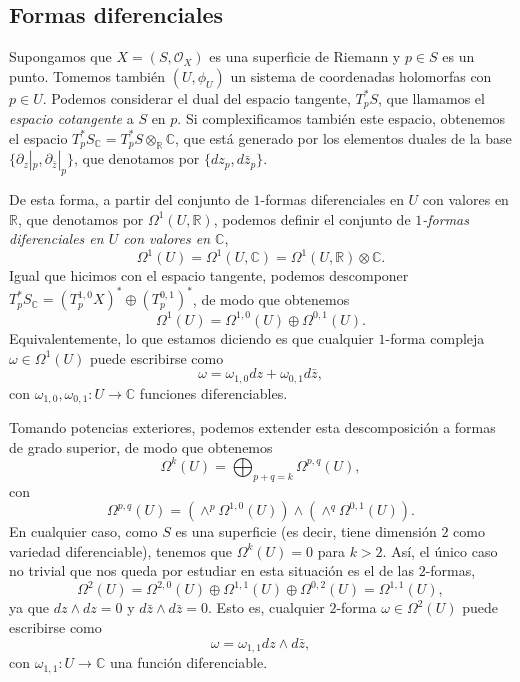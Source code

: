 \documentclass[12pt,a4paper]{article}
\theoremstyle{definition} \newtheorem{defn}[thm]{Definición}
\theoremstyle{definition} \newtheorem{ejemplo}[thm]{Ejemplo}
\theoremstyle{definition} \newtheorem{ejercicio}[thm]{Ejercicio}
\def\CC{\mathbb{C}}
\def\RR{\mathbb{R}}
\def\OO{\mathscr{O}}
\begin{document}
    \subsection{Formas diferenciales}
    Supongamos que $X=(S,\OO_X)$ es una superficie de Riemann y $p\in S$ es un punto. Tomemos también $(U,\phi_U)$ un sistema de coordenadas holomorfas con $p \in U$. Podemos considerar el dual del espacio tangente, $T^*_p S$, que llamamos el \emph{espacio cotangente} a $S$ en $p$. Si complexificamos también este espacio, obtenemos el espacio $T^*_pS_{\CC} = T^*_p S \otimes_\RR \CC$, que está generado por los elementos duales de la base $\{\partial_z|_p, \partial_{\bar{z}}|_p\}$, que denotamos por $\{dz_p, d\bar{z}_p\}$. 

    De esta forma, a partir del conjunto de $1$-formas diferenciales en $U$ con valores en $\RR$, que denotamos por $\Omega^1(U,\RR)$, podemos definir el conjunto de \emph{$1$-formas diferenciales en $U$ con valores en $\CC$},
    \begin{equation*}
      \Omega^1(U)=\Omega^1(U,\CC) = \Omega^1(U,\RR) \otimes \CC.
    \end{equation*}
    Igual que hicimos con el espacio tangente, podemos descomponer $T^*_p S_\CC = (T_p^{1,0}X) ^* \oplus (T_p^{0,1})^*$, de modo que obtenemos
    \begin{equation*}
      \Omega^1(U)=\Omega^{1,0}(U) \oplus \Omega^{0,1}(U).
    \end{equation*}
    Equivalentemente, lo que estamos diciendo es que cualquier $1$-forma compleja $\omega\in \Omega^1(U)$ puede escribirse como
    \begin{equation*}
      \omega= \omega_{1,0} dz + \omega_{0,1}d\bar{z},
    \end{equation*}
    con $\omega_{1,0},\omega_{0,1}:U \rightarrow \CC$ funciones diferenciables.

    Tomando potencias exteriores, podemos extender esta descomposición a formas de grado superior, de modo que obtenemos
    \begin{equation*}
      \Omega^k(U) = \bigoplus_{p+q=k} \Omega^{p,q}(U),
    \end{equation*}
    con 
    \begin{equation*}
      \Omega^{p,q}(U)= \left( \wedge^p \Omega^{1,0}(U) \right) \wedge \left( \wedge^q \Omega^{0,1}(U) \right).
    \end{equation*}
    En cualquier caso, como $S$ es una superficie (es decir, tiene dimensión $2$ como variedad diferenciable), tenemos que $\Omega^k(U)=0$ para $k>2$. Así, el único caso no trivial que nos queda por estudiar en esta situación es el de las $2$-formas,
    \begin{equation*}
      \Omega^2(U)= \Omega^{2,0}(U) \oplus \Omega^{1,1}(U) \oplus \Omega^{0,2}(U)= \Omega^{1,1}(U),
    \end{equation*}
    ya que $dz\wedge dz = 0$ y $d\bar{z} \wedge d\bar{z}= 0$. Esto es, cualquier $2$-forma $\omega \in \Omega^2(U)$ puede escribirse como
    \begin{equation*}
      \omega = \omega_{1,1} dz \wedge d\bar{z},
    \end{equation*}
    con $\omega_{1,1}:U\rightarrow \CC$ una función diferenciable.
\end{document}
